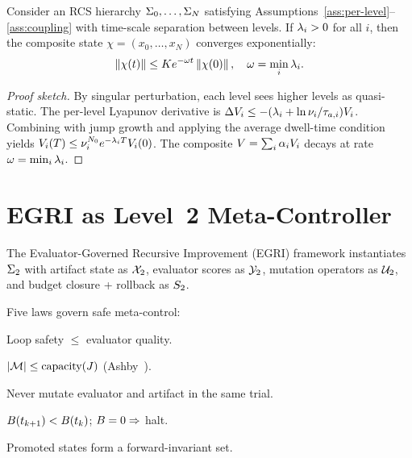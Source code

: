 \documentclass[conference]{IEEEtran}
\begin{document}
\begin{theorem}
\label{thm:recursive}
Consider an RCS hierarchy $\Sigma_0, \ldots, \Sigma_N$ satisfying
Assumptions~\ref{ass:per-level}--\ref{ass:coupling} with time-scale
separation between levels.  If $\lambda_i > 0$ for all $i$,
then the composite state $\chi = (x_0, \ldots, x_N)$ converges
exponentially:
\begin{equation}
  \left\| \chi(t) \right\| \leq K e^{-\omega t} \left\| \chi(0) \right\|,
  \quad \omega = \min_i \lambda_i.
\end{equation}
\end{theorem}

\begin{proof}[Proof sketch]
By singular perturbation, each level sees higher levels as quasi-static.
The per-level Lyapunov derivative is
$\Delta\lyap{i} \leq -(\stab_i + \ln\nu_i/\taua[i])\lyap{i}$.
Combining with jump growth and applying the average dwell-time
condition~\cite{hespanha1999stability} yields
$V_{i}(T) \leq \nu_i^{N_0} e^{-\lambda_i T}V_{i}(0)$.
The composite $V = \sum_i \alpha_iV_{i}$ decays at rate
$\omega = \min_i \lambda_i$.
\end{proof}

\section{EGRI as Level~2 Meta-Controller}
\label{sec:egri}

The Evaluator-Governed Recursive Improvement (EGRI) framework instantiates
$\Sigma_2$ with artifact state as $\mathcal{X}_2$, evaluator scores as $\mathcal{Y}_2$, mutation
operators as $\mathcal{U}_2$, and budget closure + rollback as $S_2$.

Five laws govern safe meta-control:
\begin{law}
Loop safety $\leq$ evaluator quality.
\end{law}
\begin{law}
$|\mathcal{M}| \leq \text{capacity}(J)$ (Ashby~\cite{ashby1956introduction}).
\end{law}
\begin{law}
Never mutate evaluator and artifact in the same trial.
\end{law}
\begin{law}
$B(t_{k+1}) < B(t_k)$; $B = 0 \Rightarrow$ halt.
\end{law}
\begin{law}
Promoted states form a forward-invariant set.
\end{law}
\end{document}

